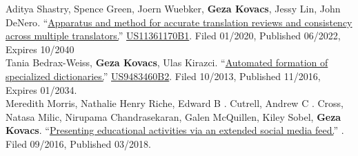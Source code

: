 
{\small Aditya Shastry, Spence Green, Joern Wuebker,} \textbf{Geza Kovacs}, {\small Jessy Lin, John DeNero}. ``\href{https://patents.google.com/patent/US11361170B1/en}{Apparatus and method for accurate translation reviews and consistency across multiple translators.}'' \hypersetup{urlcolor=black}\href{https://patents.google.com/patent/US11361170B1/en}{US11361170B1}. Filed 01/2020, Published 06/2022, Expires 10/2040\\

{\small Tania Bedrax-Weiss,} \textbf{Geza Kovacs}, {\small Ulas Kirazci.} ``\href{https://patents.google.com/patent/US9483460B2}{Automated formation of specialized dictionaries.}'' \hypersetup{urlcolor=black}\href{https://patents.google.com/patent/US9483460B2}{US9483460B2}\hypersetup{urlcolor=linkcol}. Filed 10/2013, Published 11/2016, Expires 01/2034.\\

{\small Meredith Morris, Nathalie Henry Riche, Edward B . Cutrell, Andrew C . Cross, Natasa Milic, Nirupama Chandrasekaran, Galen McQuillen, Kiley Sobel,} \textbf{Geza Kovacs}. ``\href{https://patents.google.com/patent/US20180068578A1}{Presenting educational activities via an extended social media feed.}'' . Filed 09/2016, Published 03/2018.\\ %